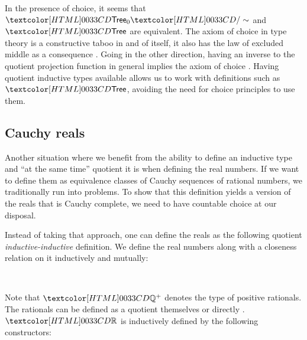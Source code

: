 In the presence of choice, it seems that
$\quotty{\pretreety}{\treerel}$ and $\treety$ are equivalent. The
axiom of choice in type theory is a constructive taboo in and of
itself, it also has the law of excluded middle as a consequence
\cite{Diaconescu1975}. Going in the other direction, having an inverse
to the quotient projection function in general implies the axiom of
choice \cite{Hofmann1995}. Having quotient inductive types available
allows us to work with definitions such as $\treety$, avoiding the
need for choice principles to use them.

\subsection{Cauchy reals}
\label{cauchy-reals}

Another situation where we benefit from the ability to define an
inductive type and ``at the same time'' quotient it is when defining
the real numbers. If we want to define them as equivalence classes of
Cauchy sequences of rational numbers, we traditionally run into
problems. To show that this definition yields a version of the reals
that is Cauchy complete, we need to have countable choice at our
disposal.

Instead of taking that approach, one can define the reals as the
following quotient \emph{inductive-inductive} definition. We define
the real numbers along with a closeness relation on it inductively and
mutually:
\begin{sorts}
  \sortnamety{\realty}{\Set} \\
  \sortnamety{\realrel{\_}{\_}{\_}}{\ratty_+ \to \realty \to \realty \to \Set}
\end{sorts}

Note that $\ratty^+$ denotes the type of positive rationals. The
rationals can be defined as a quotient themselves or directly
\cite{Altenkirch2011ii}. $\realty$ is inductively defined by the
following constructors:

\begin{datatype}{\realty}{}
  \constr{\realrat}{\ratty \to \realty} \\
   \\
   \\
\end{datatype}

